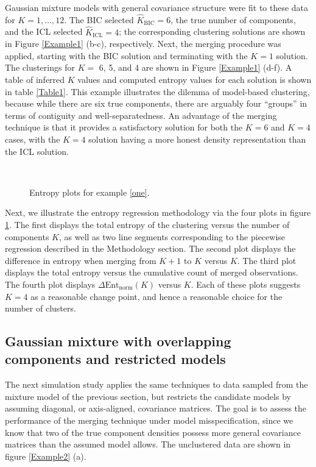 \documentclass{uwstat572}
\newcommand*\estim[1]{\widehat{#1}}
\renewcommand\;{\,}
\begin{document}
Gaussian mixture models with general covariance structure were fit to these data for $K = 1, \dotsc, 12$.
The BIC selected $\estim K_{\text{BIC}} = 6$, the true number of components, and the ICL selected $\estim K_{\text{ICL}} = 4$; the corresponding clustering solutions are shown in Figure \ref{Example1} (b-c), respectively.
Next, the merging procedure was applied, starting with the BIC solution and terminating with the $K = 1$ solution.
The clusterings for $K = $ 6, 5, and 4 are shown in Figure \ref{Example1} (d-f).
A table of inferred $K$ values and computed entropy values for each solution is shown in table \ref{Table1}.
This example illustrates the dilemma of model-based clustering, because while there are six true components, there are arguably four ``groups'' in terms of contiguity and well-separatedness.
An advantage of the merging technique is that it provides a satisfactory solution for both the $K = 6$ and $K = 4$ cases, with the $K = 4$ solution having a more honest density representation than the ICL solution.
\begin{figure}
\begin{center}
\\
\end{center}
\caption{Entropy plots for example \ref{one}.}
\label{Entropy1}
\end{figure}


Next, we illustrate the entropy regression methodology via the four plots in figure \ref{Entropy1}.
The first displays the total entropy of the clustering versus the number of components $K$, as well as two line segments corresponding to the piecewise regression described in the Methodology section.
The second plot displays the difference in entropy when merging from $K + 1$ to $K$ versus $K$.
The third plot displays the total entropy versus the cumulative count of merged observations.
The fourth plot displays $\Delta \text{Ent}_\text{norm}(K)$ versus $K$.
Each of these plots suggests $K = 4$ as a reasonable change point, and hence a reasonable choice for the number of clusters.

\subsection{Gaussian mixture with overlapping components and restricted models}\label{two}
The next simulation study applies the same techniques to data sampled from the mixture model of the previous section, but restricts the candidate models by assuming diagonal, or axis-aligned, covariance matrices.
The goal is to assess the performance of the merging technique under model misspecification, since we know that two of the true component densities possess more general covariance matrices than the assumed model allows.
The unclustered data are shown in figure \ref{Example2} (a).
\end{document}
